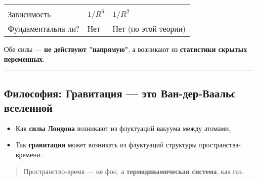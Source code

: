 \documentclass[11pt]{article}
\providecommand{\tightlist}{%
      \setlength{\itemsep}{0pt}\setlength{\parskip}{0pt}}
\begin{document}
\begin{longtable}[]{@{}lll@{}}
\begin{minipage}[t]{0.34\columnwidth}
\end{minipage}\tabularnewline
\begin{minipage}[t]{0.11\columnwidth}\raggedright\strut
Зависимость\strut
\end{minipage} & \begin{minipage}[t]{0.32\columnwidth}\raggedright\strut
\(1/R^6\)\strut
\end{minipage} & \begin{minipage}[t]{0.34\columnwidth}\raggedright\strut
\(1/R^2\)\strut
\end{minipage}\tabularnewline
\begin{minipage}[t]{0.11\columnwidth}\raggedright\strut
Фундаментальна ли?\strut
\end{minipage} & \begin{minipage}[t]{0.32\columnwidth}\raggedright\strut
Нет\strut
\end{minipage} & \begin{minipage}[t]{0.34\columnwidth}\raggedright\strut
Нет (по этой теории)\strut
\end{minipage}\tabularnewline
\bottomrule
\end{longtable}

Обе силы --- \textbf{не действуют "напрямую"}, а возникают из
\textbf{статистики скрытых переменных}.

\begin{center}\rule{0.5\linewidth}{\linethickness}\end{center}

\subsection{\texorpdfstring{Философия: \textbf{Гравитация --- это
Ван-дер-Ваальс
вселенной}}{Философия: Гравитация --- это Ван-дер-Ваальс вселенной}}\label{ux444ux438ux43bux43eux441ux43eux444ux438ux44f-ux433ux440ux430ux432ux438ux442ux430ux446ux438ux44f-ux44dux442ux43e-ux432ux430ux43d-ux434ux435ux440-ux432ux430ux430ux43bux44cux441-ux432ux441ux435ux43bux435ux43dux43dux43eux439}

\begin{itemize}
\tightlist
\item
  Как \textbf{силы Лондона} возникают из флуктуаций вакуума между
  атомами,
\item
  Так \textbf{гравитация} может возникать из флуктуаций структуры
  пространства-времени.
\end{itemize}

\begin{quote}
Пространство-время --- не фон, а \textbf{термодинамическая система}, как
газ.
\end{quote}
\end{document}
